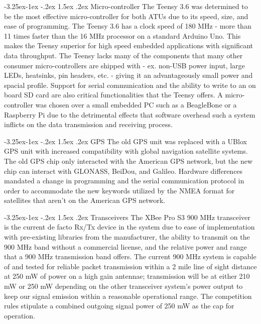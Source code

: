 \documentclass[onecolumn, draftclsnofoot, 10pt, compsoc]{IEEEtran}
\makeatletter
\renewcommand\paragraph{\@startsection{paragraph}{4}{\z@}%
                                     {-3.25ex\@plus -1ex \@minus -.2ex}%
                                     {1.5ex \@plus .2ex}%
                                     {\normalfont\normalsize\bfseries}}
\makeatother
\begin{document}
\paragraph{Micro-controller}
The Teensy 3.6 was determined to be the most effective micro-controller for both ATUs due to its speed, size, and ease of programming. The Teensy 3.6 has a clock speed of 180 MHz - more than 11 times faster than the 16 MHz processor on a standard Arduino Uno. This makes the Teensy superior for high speed embedded applications with significant data throughput. The Teensy lacks many of the components that many other consumer micro-controllers are shipped with - ex. non-USB power input, large LEDs, heatsinks, pin headers, etc. - giving it an advantageously small power and spacial profile. Support for serial communication and the ability to write to an on board SD card are also critical functionalities that the Teensy offers. A micro-controller was chosen over a small embedded PC such as a BeagleBone or a Raspberry Pi due to the detrimental effects that software overhead such a system inflicts on the data transmission and receiving process.

\paragraph{GPS}
The old GPS unit was replaced with a UBlox GPS unit with increased compatibility with global navigation satellite systems. The old GPS chip only interacted with the American GPS network, but the new chip can interact with GLONASS, BeiDou, and Galileo. Hardware differences mandated a change in programming and the serial communication protocol in order to accommodate the new keywords utilized by the NMEA format for satellites that aren't on the American GPS network.

\paragraph{Transceivers}
The XBee Pro S3 900 MHz transceiver is the current de facto Rx/Tx device in the system due to ease of implementation with pre-existing libraries from the manufacturer, the ability to transmit on the 900 MHz band without a commercial license, and the relative power and range that a 900 MHz transmission band offers. The current 900 MHz system is capable of and tested for reliable packet transmission within a 2 mile line of sight distance at 250 mW of power on a high gain antennae; transmission will be at either 210 mW or 250 mW depending on the other transceiver system's power output to keep our signal emission within a reasonable operational range. The competition rules stipulate a combined outgoing signal power of 250 mW as the cap for operation.\newline
\end{document}
